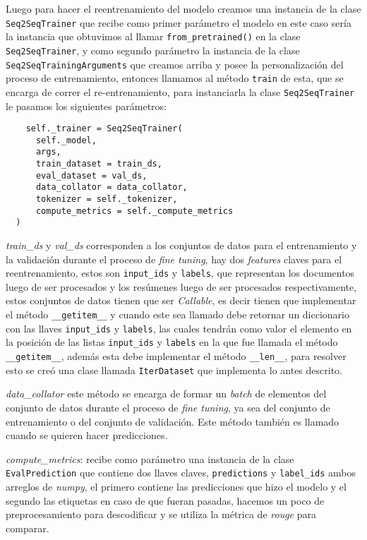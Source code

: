 Luego para hacer el reentrenamiento del modelo creamos una instancia de la clase \texttt{Seq2SeqTrainer} que recibe como primer parámetro el modelo en este caso sería la instancia que obtuvimos al llamar \texttt{from\_pretrained()} en la clase \texttt{Seq2SeqTrainer}, y como segundo parámetro la instancia de la clase \texttt{Seq2SeqTrainingArguments} que creamos arriba y posee la personalización del proceso de entrenamiento, entonces llamamos al método \texttt{train} de esta, que se encarga de correr el re-entrenamiento, para instanciarla la clase \texttt{Seq2SeqTrainer} le pasamos los siguientes parámetros:

\begin{verbatim}
    self._trainer = Seq2SeqTrainer(
      self._model,
      args,
      train_dataset = train_ds,
      eval_dataset = val_ds,
      data_collator = data_collator,
      tokenizer = self._tokenizer,
      compute_metrics = self._compute_metrics
  )
\end{verbatim}

\textit{train\_ds} y \textit{val\_ds} corresponden a los conjuntos de datos para el entrenamiento y la validación durante el proceso de \textit{fine tuning}, hay dos \textit{features} claves para el reentrenamiento, estos son \texttt{input\_ids} y \texttt{labels}, que representan los documentos luego de ser procesados  y los resúmenes luego de ser procesados respectivamente, estos conjuntos de datos tienen que ser \textit{Callable}, es decir tienen que implementar el método \texttt{\_\_getitem\_\_} y cuando este sea llamado debe retornar un diccionario con las llaves \texttt{input\_ids} y \texttt{labels}, las cuales tendrán como valor el elemento en la posición de las listas \texttt{input\_ids} y \texttt{labels} en la que fue llamada el método \texttt{\_\_getitem\_\_}, además esta debe implementar el método \texttt{\_\_len\_\_}, para resolver esto se creó una clase llamada \texttt{IterDataset} que implementa lo antes descrito.

\textit{data\_collator} este método se encarga de formar un \textit{batch} de elementos del conjunto de datos durante el proceso de \textit{fine tuning}, ya sea del conjunto de entrenamiento o del conjunto de validación. Este método también es llamado cuando se quieren hacer predicciones.

\textit{compute\_metrics}: recibe como parámetro una instancia de la clase \texttt{EvalPrediction} que contiene dos llaves claves, \texttt{predictions} y \texttt{label\_ids} ambos arreglos de \textit{numpy}, el primero contiene las predicciones que hizo el modelo y el segundo las etiquetas en caso de que fueran pasadas, hacemos un poco de preprocesamiento para descodificar y se utiliza la métrica de \textit{rouge} para comparar.

